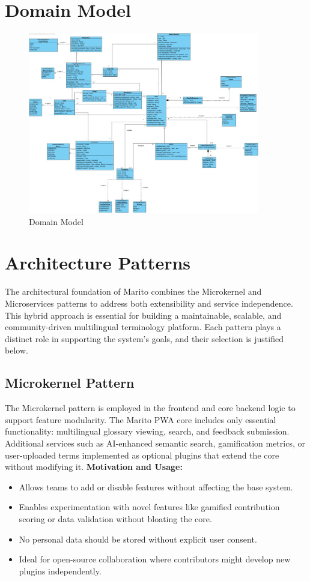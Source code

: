 \documentclass[12pt]{article}
\begin{document}
\section{Domain Model}
\begin{figure}[H]
  \centering
  \includegraphics[width=0.9\textwidth]{domain_model_V1.1.0.jpg}
  \caption{Domain Model}
  \label{fig:domain-model}
\end{figure}

\section{Architecture Patterns}
The architectural foundation of Marito combines the Microkernel and Microservices patterns to address both extensibility and service independence. This hybrid approach is essential for building a maintainable, scalable, and community-driven multilingual terminology platform. Each pattern plays a distinct role in supporting the system’s goals, and their selection is justified below.

\subsection{Microkernel Pattern}
The Microkernel pattern is employed in the frontend and core backend logic to support feature modularity. The Marito PWA core includes only essential functionality: multilingual glossary viewing, search, and feedback submission. Additional services such as AI-enhanced semantic search, gamification metrics, or user-uploaded terms implemented as optional plugins that extend the core without modifying it.
\newline
\textbf{Motivation and Usage:}
\begin{itemize}
    \item Allows teams to add or disable features without affecting the base system.
    \item Enables experimentation with novel features like gamified contribution scoring or data validation without bloating the core.
    \item No personal data should be stored without explicit user consent.
    \item Ideal for open-source collaboration where contributors might develop new plugins independently.
\end{itemize}
\end{document}
